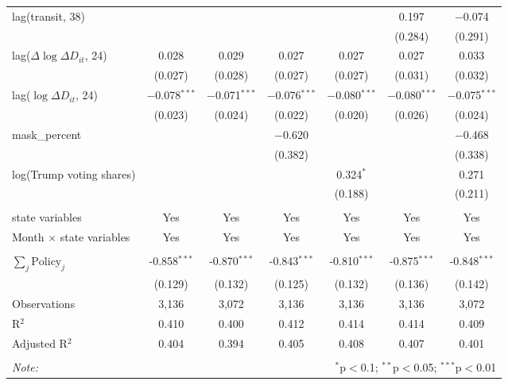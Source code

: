 \begin{tabular}{@{\extracolsep{1pt}}lcccccc}
  lag(transit, 38) &  &  &  &  & 0.197 & $-$0.074 \\ 
  &  &  &  &  & (0.284) & (0.291) \\ 
  lag($\Delta \log \Delta D_{it}$, 24) & 0.028 & 0.029 & 0.027 & 0.027 & 0.027 & 0.033 \\ 
  & (0.027) & (0.028) & (0.027) & (0.027) & (0.031) & (0.032) \\ 
  lag($\log \Delta D_{it}$, 24) & $-$0.078$^{***}$ & $-$0.071$^{***}$ & $-$0.076$^{***}$ & $-$0.080$^{***}$ & $-$0.080$^{***}$ & $-$0.075$^{***}$ \\ 
  & (0.023) & (0.024) & (0.022) & (0.020) & (0.026) & (0.024) \\ 
  mask\_percent &  &  & $-$0.620 &  &  & $-$0.468 \\ 
  &  &  & (0.382) &  &  & (0.338) \\ 
  log(Trump voting shares) &  &  &  & 0.324$^{*}$ &  & 0.271 \\ 
  &  &  &  & (0.188) &  & (0.211) \\ 
 \hline \\[-1.8ex] 
state variables & Yes & Yes & Yes & Yes & Yes & Yes \\ 
Month $\times$ state variables & Yes & Yes & Yes & Yes & Yes & Yes \\ 
\hline \\[-1.8ex] 
$\sum_j \mathrm{Policy}_j$ & -0.858$^{***}$ & -0.870$^{***}$ & -0.843$^{***}$ & -0.810$^{***}$ & -0.875$^{***}$ & -0.848$^{***}$ \\ 
 & (0.129) & (0.132) & (0.125) & (0.132) & (0.136) & (0.142) \\ 
Observations & 3,136 & 3,072 & 3,136 & 3,136 & 3,136 & 3,072 \\ 
R$^{2}$ & 0.410 & 0.400 & 0.412 & 0.414 & 0.414 & 0.409 \\ 
Adjusted R$^{2}$ & 0.404 & 0.394 & 0.405 & 0.408 & 0.407 & 0.401 \\ 
\hline 
\hline \\[-1.8ex] 
\textit{Note:}  & \multicolumn{6}{r}{$^{*}$p$<$0.1; $^{**}$p$<$0.05; $^{***}$p$<$0.01} \\ 
\end{tabular} 
